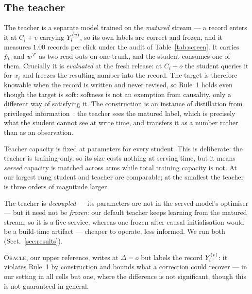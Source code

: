 \subsection{The teacher}

The teacher is a separate model trained on the \emph{matured} stream --- a record enters it at
$C_i+v$ carrying $Y^{(v)}_i$, so its own labels are correct and frozen, and it measures $1.00$
records per click under the audit of Table~\ref{tab:screen}. It carries $\hat{p}_v$ and $w^{T}$ as two
read-outs on one trunk, and the student consumes one of them. Crucially it is \emph{evaluated}
at the fresh release: at $C_i+o$ the student queries it for $x_i$ and freezes the resulting
number into the record. The target is therefore knowable when the record is written and never
revised, so Rule~1 holds even though the target is soft: softness is not an exemption from
causality, only a different way of satisfying it. The construction is an instance of
distillation from
privileged information~\cite{xu2020privileged}: the teacher sees the matured label, which is
precisely what the student cannot see at write time, and transfers it as a number rather than
as an observation.

Teacher capacity is fixed at \teacherParams{} parameters for every student. This is
deliberate: the teacher is training-only, so its size costs nothing at serving
time, but it means \emph{served} capacity is matched across arms while total training capacity
is not. At our largest rung student and teacher are comparable; at the smallest the teacher is
three orders of magnitude larger.

The teacher is \emph{decoupled} --- its parameters are not in the served model's optimiser ---
but it need not be \emph{frozen}: our default teacher keeps learning from the matured stream, so it is a live
service, whereas one frozen after causal initialisation would be a build-time artifact ---
cheaper to operate, less informed. We run both (Sect.~\ref{sec:results}).

\textsc{Oracle}, our upper reference, writes at $\Delta=o$ but labels the record $Y^{(v)}_i$: it
violates Rule~1 by construction and bounds what a correction could recover --- in our setting
in all \cdOracleN{} cells but one, where the difference is not significant, though this is not
guaranteed in general.
